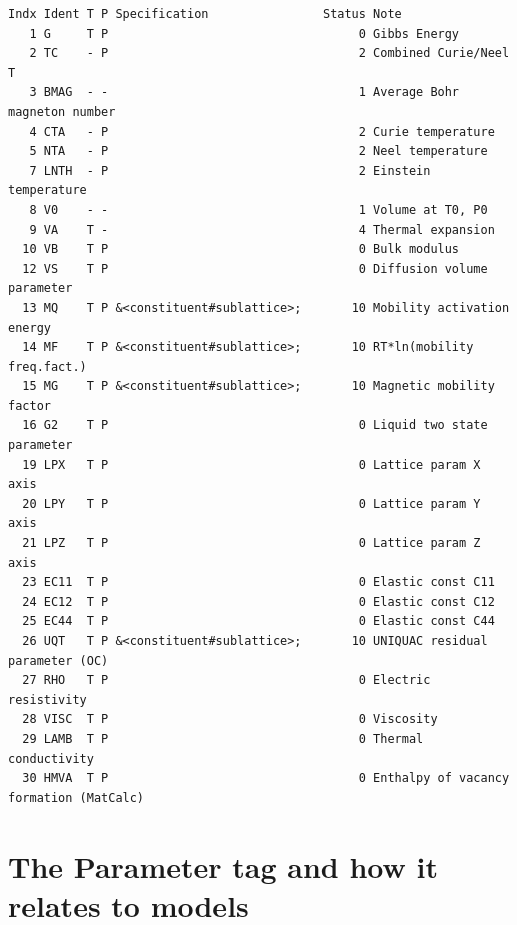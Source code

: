 \documentclass{article}
\begin{document}
\begin{appendices}
\begin{table}[!h]
{\small
\begin{verbatim}
Indx Ident T P Specification                Status Note
   1 G     T P                                   0 Gibbs Energy
   2 TC    - P                                   2 Combined Curie/Neel T
   3 BMAG  - -                                   1 Average Bohr magneton number
   4 CTA   - P                                   2 Curie temperature
   5 NTA   - P                                   2 Neel temperature
   7 LNTH  - P                                   2 Einstein temperature
   8 V0    - -                                   1 Volume at T0, P0
   9 VA    T -                                   4 Thermal expansion
  10 VB    T P                                   0 Bulk modulus
  12 VS    T P                                   0 Diffusion volume parameter
  13 MQ    T P &<constituent#sublattice>;       10 Mobility activation energy
  14 MF    T P &<constituent#sublattice>;       10 RT*ln(mobility freq.fact.)
  15 MG    T P &<constituent#sublattice>;       10 Magnetic mobility factor
  16 G2    T P                                   0 Liquid two state parameter
  19 LPX   T P                                   0 Lattice param X axis
  20 LPY   T P                                   0 Lattice param Y axis
  21 LPZ   T P                                   0 Lattice param Z axis
  23 EC11  T P                                   0 Elastic const C11
  24 EC12  T P                                   0 Elastic const C12
  25 EC44  T P                                   0 Elastic const C44
  26 UQT   T P &<constituent#sublattice>;       10 UNIQUAC residual parameter (OC)
  27 RHO   T P                                   0 Electric resistivity
  28 VISC  T P                                   0 Viscosity
  29 LAMB  T P                                   0 Thermal conductivity
  30 HMVA  T P                                   0 Enthalpy of vacancy formation (MatCalc)
\end{verbatim}
  }
\end{table}

\newpage 

\setcounter{equation}{0}
\renewcommand{\theequation}{C\arabic{equation}}
\setcounter{figure}{0}
\renewcommand{\thefigure}{C\arabic{figure}}


\section{The Parameter tag and how it relates to models}\label{sec:partags}


\end{appendices}
\end{document}
